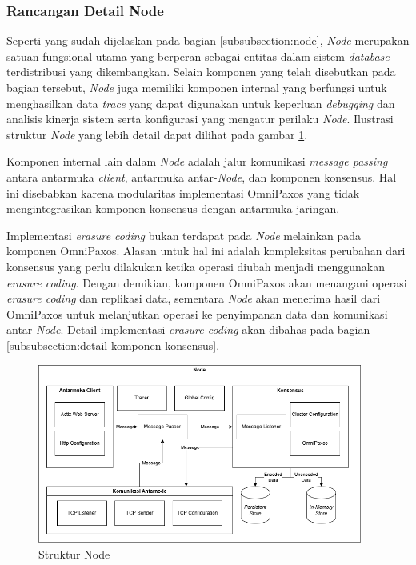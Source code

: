 \subsubsection{Rancangan Detail Node}
\label{subsubsection:detail-node}

Seperti yang sudah dijelaskan pada bagian \ref{subsubsection:node}, \textit{Node} merupakan satuan fungsional utama yang berperan sebagai entitas dalam sistem \textit{database} terdistribusi yang dikembangkan. Selain komponen yang telah disebutkan pada bagian tersebut, \textit{Node} juga memiliki komponen internal yang berfungsi untuk menghasilkan data \textit{trace} yang dapat digunakan untuk keperluan \textit{debugging} dan analisis kinerja sistem serta konfigurasi yang mengatur perilaku \textit{Node}. Ilustrasi struktur \textit{Node} yang lebih detail dapat dilihat pada gambar \ref{fig:node-structure}.

Komponen internal lain dalam \textit{Node} adalah jalur komunikasi \textit{message passing} antara antarmuka \textit{client}, antarmuka antar-\textit{Node}, dan komponen konsensus. Hal ini disebabkan karena modularitas implementasi OmniPaxos yang tidak mengintegrasikan komponen konsensus dengan antarmuka jaringan.

Implementasi \textit{erasure coding} bukan terdapat pada \textit{Node} melainkan pada komponen OmniPaxos. Alasan untuk hal ini adalah kompleksitas perubahan dari konsensus yang perlu dilakukan ketika operasi diubah menjadi menggunakan \textit{erasure coding}. Dengan demikian, komponen OmniPaxos akan menangani operasi \textit{erasure coding} dan replikasi data, sementara \textit{Node} akan menerima hasil dari OmniPaxos untuk melanjutkan operasi ke penyimpanan data dan komunikasi antar-\textit{Node}. Detail implementasi \textit{erasure coding} akan dibahas pada bagian \ref{subsubsection:detail-komponen-konsensus}.

\begin{figure}[ht]
    \centering
    \includegraphics[width=0.95\textwidth]{resources/chapter-3/node-architecture.png}
    \caption{Struktur Node}
    \label{fig:node-structure}
\end{figure}
